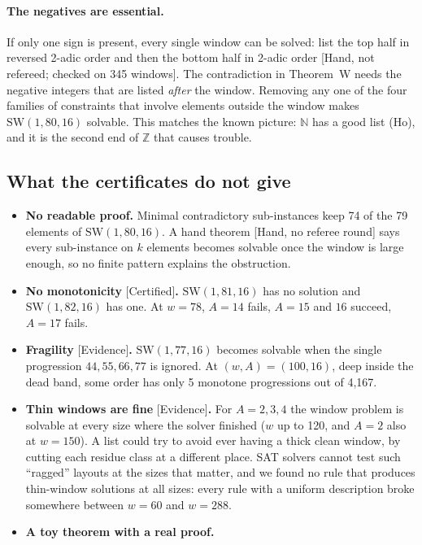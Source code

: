 \documentclass[11pt,letterpaper]{article}
\newcommand{\Z}{\mathbb{Z}}
\newcommand{\N}{\mathbb{N}}
\newcommand{\SW}{\mathrm{SW}}
\newcommand{\st}[1]{\textnormal{\textsf{\small[#1]}}}
\begin{document}
\paragraph{The negatives are essential.} If only one sign is present, every single window can be solved:
list the top half in reversed 2-adic order and then the bottom half in 2-adic order \st{Hand, not refereed;
checked on 345 windows}. The contradiction in Theorem~W needs the negative integers that are listed
\emph{after} the window. Removing any one of the four families of constraints that involve elements outside
the window makes $\SW(1,80,16)$ solvable. This matches the known picture: $\N$ has a good list (Ho), and it
is the second end of $\Z$ that causes trouble.

\subsection{What the certificates do not give}\label{sec:notgive}

\begin{itemize}
\item \textbf{No readable proof.} Minimal contradictory sub-instances keep 74 of the 79 elements of
$\SW(1,80,16)$. A hand theorem \st{Hand, no referee round} says every sub-instance on $k$ elements becomes
solvable once the window is large enough, so no finite pattern explains the obstruction.
\item \textbf{No monotonicity} \st{Certified}\textbf{.} $\SW(1,81,16)$ has no solution and $\SW(1,82,16)$
has one. At $w = 78$, $A = 14$ fails, $A = 15$ and $16$ succeed, $A = 17$ fails.
\item \textbf{Fragility} \st{Evidence}\textbf{.} $\SW(1,77,16)$ becomes solvable when the single
progression $44, 55, 66, 77$ is ignored. At $(w,A) = (100,16)$, deep inside the dead band, some order has
only 5 monotone progressions out of 4{,}167.
\item \textbf{Thin windows are fine} \st{Evidence}\textbf{.} For $A = 2, 3, 4$ the window problem is
solvable at every size where the solver finished ($w$ up to 120, and $A = 2$ also at $w = 150$). A list could
try to avoid ever having a thick clean window, by cutting each residue class at a different place. SAT
solvers cannot test such ``ragged'' layouts at the sizes that matter, and we found no rule that produces
thin-window solutions at all sizes: every rule with a uniform description broke somewhere between $w = 60$
and $w = 288$.
\item \textbf{A toy theorem with a real proof.}
\end{itemize}
\end{document}
